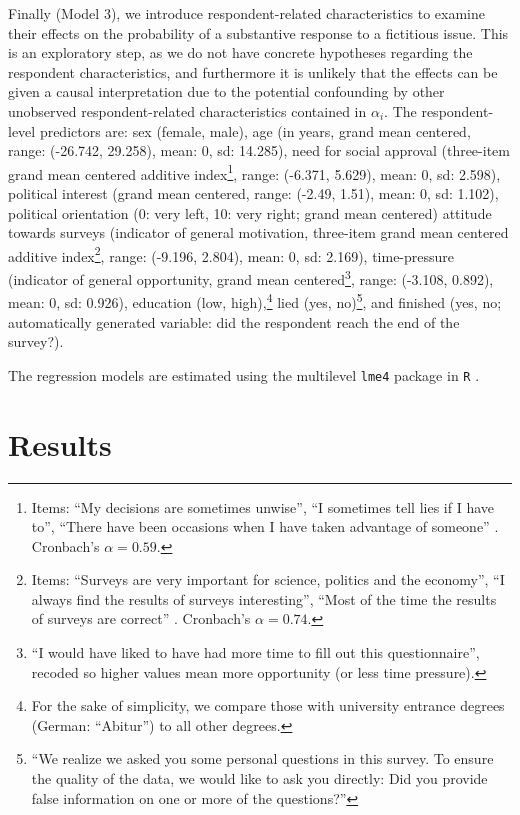 \documentclass[Royal,times,sageh]{sagej}
\begin{document}
Finally (Model 3), we introduce respondent-related characteristics to
examine their effects on the probability of a substantive response to a
fictitious issue. This is an exploratory step, as we do not have
concrete hypotheses regarding the respondent characteristics, and
furthermore it is unlikely that the effects can be given a causal
interpretation due to the potential confounding by other unobserved
respondent-related characteristics contained in \(\alpha_{i}\). The
respondent-level predictors are: sex (female, male), age (in years,
grand mean centered, range: (-26.742, 29.258), mean: 0, sd: 14.285),
need for social approval (three-item grand mean centered additive
index\footnote{Items: ``My decisions are sometimes unwise'', ``I
  sometimes tell lies if I have to'', ``There have been occasions when I
  have taken advantage of someone''
  \citep{Paulhus1984, Paulhus1988, Hart2015, Blasberg2013}. Cronbach's
  \(\alpha = 0.59\).}, range: (-6.371, 5.629), mean: 0, sd: 2.598),
political interest (grand mean centered, range: (-2.49, 1.51), mean: 0,
sd: 1.102), political orientation (0: very left, 10: very right; grand
mean centered) attitude towards surveys (indicator of general
motivation, three-item grand mean centered additive index\footnote{Items:
  ``Surveys are very important for science, politics and the economy'',
  ``I always find the results of surveys interesting'', ``Most of the
  time the results of surveys are correct''
  \citep{Stocke2006, Stocke2014}. Cronbach's \(\alpha = 0.74\).}, range:
(-9.196, 2.804), mean: 0, sd: 2.169), time-pressure (indicator of
general opportunity, grand mean centered\footnote{``I would have liked
  to have had more time to fill out this questionnaire'', recoded so
  higher values mean more opportunity (or less time pressure).}, range:
(-3.108, 0.892), mean: 0, sd: 0.926), education (low, high),\footnote{For
  the sake of simplicity, we compare those with university entrance
  degrees (German: ``Abitur'') to all other degrees.} lied (yes,
no)\footnote{``We realize we asked you some personal questions in this
  survey. To ensure the quality of the data, we would like to ask you
  directly: Did you provide false information on one or more of the
  questions?''}, and finished (yes, no; automatically generated
variable: did the respondent reach the end of the survey?).

The regression models are estimated using the multilevel \texttt{lme4}
\citep{R-lme4} package in \texttt{R} \citep{R-base}.

\hypertarget{results}{%
\section{Results}\label{results}}
\end{document}
